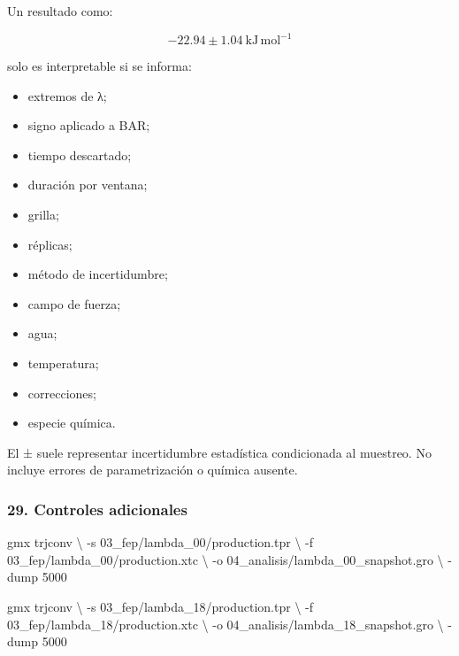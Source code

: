 \documentclass[
  spanish,
  11pt,
  a4paper]{article}
\newenvironment{Shaded}{\begin{snugshade}}{\end{snugshade}}
\newcommand{\AttributeTok}[1]{\textcolor[rgb]{0.13,0.29,0.53}{#1}}
\newcommand{\DataTypeTok}[1]{\textcolor[rgb]{0.13,0.29,0.53}{#1}}
\newcommand{\ExtensionTok}[1]{#1}
\newcommand{\NormalTok}[1]{#1}
\providecommand{\tightlist}{%
  \setlength{\itemsep}{0pt}\setlength{\parskip}{0pt}}
\begin{document}
Un resultado como:

\[
-22.94\pm1.04\ \mathrm{kJ\,mol^{-1}}
\]

solo es interpretable si se informa:

\begin{itemize}
\tightlist
\item
  extremos de λ;
\item
  signo aplicado a BAR;
\item
  tiempo descartado;
\item
  duración por ventana;
\item
  grilla;
\item
  réplicas;
\item
  método de incertidumbre;
\item
  campo de fuerza;
\item
  agua;
\item
  temperatura;
\item
  correcciones;
\item
  especie química.
\end{itemize}

El ± suele representar incertidumbre estadística condicionada al
muestreo. No incluye errores de parametrización o química ausente.

\subsubsection{29. Controles adicionales}\label{controles-adicionales}

\begin{Shaded}
\begin{Highlighting}[]
\ExtensionTok{gmx}\NormalTok{ trjconv }\DataTypeTok{\textbackslash{}}
    \AttributeTok{{-}s}\NormalTok{ 03\_fep/lambda\_00/production.tpr }\DataTypeTok{\textbackslash{}}
    \AttributeTok{{-}f}\NormalTok{ 03\_fep/lambda\_00/production.xtc }\DataTypeTok{\textbackslash{}}
    \AttributeTok{{-}o}\NormalTok{ 04\_analisis/lambda\_00\_snapshot.gro }\DataTypeTok{\textbackslash{}}
    \AttributeTok{{-}dump}\NormalTok{ 5000}

\ExtensionTok{gmx}\NormalTok{ trjconv }\DataTypeTok{\textbackslash{}}
    \AttributeTok{{-}s}\NormalTok{ 03\_fep/lambda\_18/production.tpr }\DataTypeTok{\textbackslash{}}
    \AttributeTok{{-}f}\NormalTok{ 03\_fep/lambda\_18/production.xtc }\DataTypeTok{\textbackslash{}}
    \AttributeTok{{-}o}\NormalTok{ 04\_analisis/lambda\_18\_snapshot.gro }\DataTypeTok{\textbackslash{}}
    \AttributeTok{{-}dump}\NormalTok{ 5000}
\end{Highlighting}
\end{Shaded}
\end{document}

